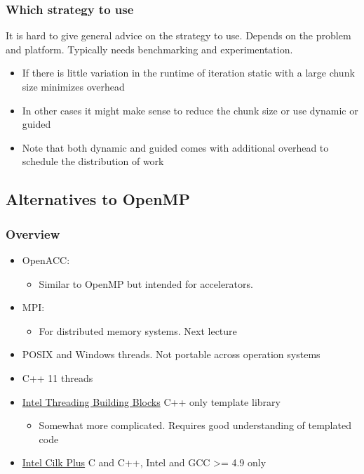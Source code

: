 \subsubsection{Which strategy to use}\label{which-strategy-to-use}

It is hard to give general advice on the strategy to use. Depends on the
problem and platform. Typically needs benchmarking and experimentation.

\begin{itemize}
\itemsep1pt\parskip0pt
\item
  If there is little variation in the runtime of iteration static with a
  large chunk size minimizes overhead
\item
  In other cases it might make sense to reduce the chunk size or use
  dynamic or guided
\item
  Note that both dynamic and guided comes with additional overhead to
  schedule the distribution of work
\end{itemize}

\subsection{Alternatives to OpenMP}\label{alternatives-to-openmp}

\subsubsection{Overview}\label{overview}

\begin{itemize}
\itemsep1pt\parskip0pt
\item
  OpenACC:

  \begin{itemize}
  \itemsep1pt\parskip0pt
  \item
    Similar to OpenMP but intended for accelerators.
  \end{itemize}
\item
  MPI:

  \begin{itemize}
  \itemsep1pt\parskip0pt
  \item
    For distributed memory systems. Next lecture
  \end{itemize}
\item
  POSIX and Windows threads. Not portable across operation systems
\item
  C++ 11 threads
\item
  \href{http://threadingbuildingblocks.org/}{Intel Threading Building
  Blocks} C++ only template library

  \begin{itemize}
  \itemsep1pt\parskip0pt
  \item
    Somewhat more complicated. Requires good understanding of templated
    code
  \end{itemize}
\item
  \href{https://www.cilkplus.org/}{Intel Cilk Plus} C and C++, Intel and
  GCC \textgreater{}= 4.9 only
\end{itemize}


